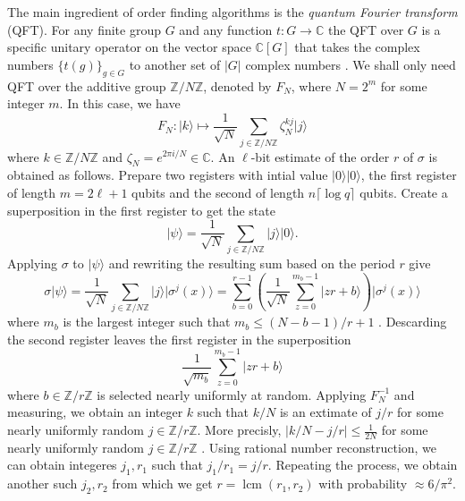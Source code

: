 \documentclass{article}
\theoremstyle{plain}
\theoremstyle{definition}
\newcommand{\ldbrac}[1]{\lvert#1\rangle}
\newcommand{\abs}[1]{\left\vert#1\right\vert}
\DeclareMathOperator{\lcm}{lcm} %
\def\C{\ensuremath{\mathbb{C}}}
\def\Z{\ensuremath{\mathbb{Z}}}
\begin{document}
The main ingredient of order finding algorithms is the \textit{quantum Fourier transform} (QFT). 
For any finite group $G$ and any function $t: G \rightarrow \C$ the QFT over $G$ is a specific 
unitary operator on the vector space $\C[G]$ that takes the complex numbers $\{ t(g) \}_{g \in 
G}$ to another set of $\abs{G}$ complex numbers \cite{hallgren2003hidden}. We shall only need QFT 
over the additive group $\Z/N\Z$, denoted by $F_N$, where $N = 2^m$ for some integer $m$. In this 
case, we have 
\[ F_N: \ldbrac{k} \longmapsto \frac{1}{\sqrt{N}}\sum_{j \in \Z/N\Z}\zeta_N^{kj}\ldbrac{j} \]
where $k \in \Z/N\Z$ and $\zeta_N = e^{2\pi i / N} \in \C$. An $\ell$-bit estimate of the order $r$ 
of $\sigma$ is obtained as follows. Prepare two registers with intial value $\ldbrac{0}\ldbrac{0}$, 
the first register of length $m = 2\ell + 1$ qubits and the second of length $n\lceil \log q 
\rceil$ qubits. Create a superposition in the first register to get the state 
\[ \ldbrac{\psi} = \frac{1}{\sqrt{N}} \sum_{j \in \Z/N\Z} \ldbrac{j}\ldbrac{0}. \]
Applying $\sigma$ to $\ldbrac{\psi}$ and rewriting the resulting sum based on the period $r$ give
\[ \sigma\ldbrac{\psi} = \frac{1}{\sqrt{N}} \sum_{j \in \Z/N\Z} \ldbrac{j}\ldbrac{\sigma^j(x)} = 
\sum_{b = 0}^{r - 1}\left( \frac{1}{\sqrt{N}}\sum_{z = 0}^{m_b - 1}\ldbrac{zr + b} \right) 
\ldbrac{\sigma^j(x)} \]
where $m_b$ is the largest integer such that $m_b \le (N - b - 1) / r + 1$ 
\cite{kaye2007introduction}. Descarding the second register leaves the first register in the 
superposition
\[ \frac{1}{\sqrt{m_b}} \sum_{z = 0}^{m_b - 1}\ldbrac{zr + b} \]
where $b \in \Z/r\Z$ is selected nearly uniformly at random. Applying $F_N^{-1}$ and measuring, we 
obtain an integer $k$ such that $k / N$ is an extimate of $j / r$ for some nearly uniformly random 
$j \in \Z/r\Z$. More precisly, $\abs{k / N - j / r} \le \frac{1}{2N}$ for some nearly uniformly 
random $j \in \Z/r\Z$ \cite{kaye2007introduction}. Using rational number reconstruction, we can 
obtain integeres $j_1, r_1$ such that $j_1 / r_1 = j / r$. Repeating the process, we obtain another 
such $j_2, r_2$ from which we get $r = \lcm(r_1, r_2)$ with probability $\approx 6 / \pi^2$. 
\end{document}
